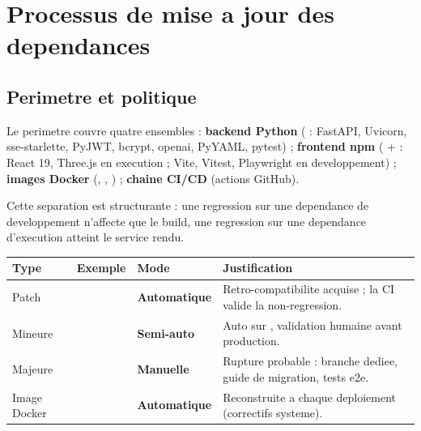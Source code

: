 \section{Processus de mise a jour des dependances}
\label{sec:deps}


\subsection{Perimetre et politique}

Le perimetre couvre quatre ensembles : \textbf{backend Python} ( :
FastAPI, Uvicorn, sse-starlette, PyJWT, bcrypt, openai, PyYAML, pytest) ; \textbf{frontend npm}
( +  : React 19, Three.js en execution ; Vite, Vitest,
Playwright en developpement) ; \textbf{images Docker} (,
, ) ; \textbf{chaine CI/CD} (actions GitHub).

Cette separation est structurante : une regression sur une dependance de developpement n'affecte
que le build, une regression sur une dependance d'execution atteint le service rendu.

\footnotesize
\begin{tabularx}{\linewidth}{@{}L{2.2cm} L{3.0cm} L{2.6cm} X@{}}
\toprule
\textbf{Type} & \textbf{Exemple} & \textbf{Mode} & \textbf{Justification} \\
\midrule
Patch  &  & \textcolor{VertOk}{\textbf{Automatique}} &
Retro-compatibilite acquise ; la CI valide la non-regression. \\
Mineure  &  & \textcolor{OrangeAlerte}{\textbf{Semi-auto}} &
Auto sur , validation humaine avant production. \\
Majeure  &  & \textcolor{RougeKo}{\textbf{Manuelle}} &
Rupture probable : branche dediee, guide de migration, tests e2e. \\
Image Docker &  & \textcolor{VertOk}{\textbf{Automatique}} &
Reconstruite a chaque deploiement (correctifs systeme). \\
\bottomrule
\end{tabularx}
\normalsize

